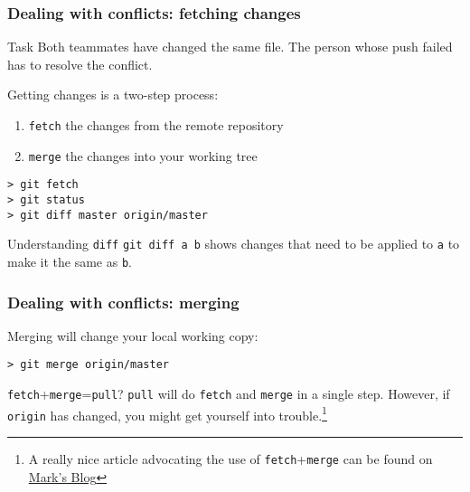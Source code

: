

\begin{frame}[fragile]
	\frametitle{Dealing with conflicts: fetching changes}

	\begin{block}{Task}
	Both teammates have changed the same file. The person whose push failed has to resolve the conflict.	
	\end{block}
	
	Getting changes is a two-step process:
	\begin{enumerate}
		\item \texttt{fetch} the changes from the remote repository
		\item \texttt{merge} the changes into your working tree
	\end{enumerate}
	
	\begin{verbatim}
> git fetch
> git status
> git diff master origin/master
	\end{verbatim}
	
	\begin{block}{Understanding \texttt{diff}}
	\texttt{git diff a b} shows changes that need to be applied to \texttt{a} to make it the same as \texttt{b}.
	\end{block}
	
\end{frame}


\begin{frame}[fragile]
	\frametitle{Dealing with conflicts: merging}
	
	Merging will change your local working copy:
	\begin{verbatim}
> git merge origin/master
	\end{verbatim}
	
	\begin{block}{\texttt{fetch}+\texttt{merge}=\texttt{pull}?}
	\texttt{pull} will do \texttt{fetch} and \texttt{merge} in a single step. However, if \texttt{origin} has changed, you might get yourself into trouble.\footnote{A really nice article advocating the use of \texttt{fetch}+\texttt{merge} can be found on \href{http://longair.net/blog/2009/04/16/git-fetch-and-merge/}{Mark's Blog}} 
	\end{block}
	
\end{frame}

